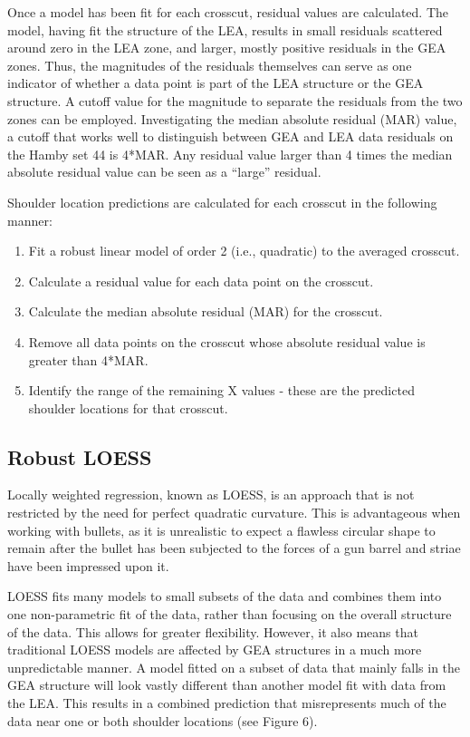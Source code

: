 \documentclass[12pt]{article}
\begin{document}
Once a model has been fit for each crosscut, residual values are
calculated. The model, having fit the structure of the LEA, results in
small residuals scattered around zero in the LEA zone, and larger,
mostly positive residuals in the GEA zones. Thus, the magnitudes of the
residuals themselves can serve as one indicator of whether a data point
is part of the LEA structure or the GEA structure. A cutoff value for
the magnitude to separate the residuals from the two zones can be
employed. Investigating the median absolute residual (MAR) value, a
cutoff that works well to distinguish between GEA and LEA data residuals
on the Hamby set 44 is 4*MAR. Any residual value larger than 4 times the
median absolute residual value can be seen as a ``large'' residual.

Shoulder location predictions are calculated for each crosscut in the
following manner:\\

\begin{enumerate}
\item Fit a robust linear model of order 2 (i.e., quadratic) to the averaged crosscut.   
\item Calculate a residual value for each data point on the crosscut.  
\item Calculate the median absolute residual (MAR) for the crosscut.  
\item Remove all data points on the crosscut whose absolute residual value is greater than 4*MAR.  
\item Identify the range of the remaining X values - these are the predicted shoulder locations for that crosscut.   
\end{enumerate}

\subsection{Robust LOESS}

Locally weighted regression, known as LOESS, is an approach that is not
restricted by the need for perfect quadratic curvature. This is
advantageous when working with bullets, as it is unrealistic to expect a
flawless circular shape to remain after the bullet has been subjected to
the forces of a gun barrel and striae have been impressed upon it.

LOESS fits many models to small subsets of the data and combines them
into one non-parametric fit of the data, rather than focusing on the
overall structure of the data. This allows for greater flexibility.
However, it also means that traditional LOESS models are affected by GEA
structures in a much more unpredictable manner. A model fitted on a
subset of data that mainly falls in the GEA structure will look vastly
different than another model fit with data from the LEA. This results in
a combined prediction that misrepresents much of the data near one or
both shoulder locations (see Figure 6).
\end{document}
